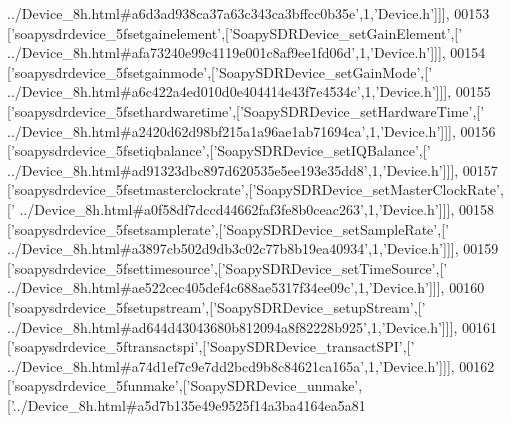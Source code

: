 \begin{DoxyCode}
{      ../Device\_8h.html#a6d3ad938ca37a63c343ca3bffcc0b35e'},1,\textcolor{stringliteral}{'Device.h'}]]],
00153   [\textcolor{stringliteral}{'soapysdrdevice\_5fsetgainelement'},[\textcolor{stringliteral}{'SoapySDRDevice\_setGainElement'},[\textcolor{stringliteral}{'
      ../Device\_8h.html#afa73240e99c4119e001c8af9ee1fd06d'},1,\textcolor{stringliteral}{'Device.h'}]]],
00154   [\textcolor{stringliteral}{'soapysdrdevice\_5fsetgainmode'},[\textcolor{stringliteral}{'SoapySDRDevice\_setGainMode'},[\textcolor{stringliteral}{'
      ../Device\_8h.html#a6c422a4ed010d0e404414e43f7e4534c'},1,\textcolor{stringliteral}{'Device.h'}]]],
00155   [\textcolor{stringliteral}{'soapysdrdevice\_5fsethardwaretime'},[\textcolor{stringliteral}{'SoapySDRDevice\_setHardwareTime'},[\textcolor{stringliteral}{'
      ../Device\_8h.html#a2420d62d98bf215a1a96ae1ab71694ca'},1,\textcolor{stringliteral}{'Device.h'}]]],
00156   [\textcolor{stringliteral}{'soapysdrdevice\_5fsetiqbalance'},[\textcolor{stringliteral}{'SoapySDRDevice\_setIQBalance'},[\textcolor{stringliteral}{'
      ../Device\_8h.html#ad91323dbc897d620535e5ee193e35dd8'},1,\textcolor{stringliteral}{'Device.h'}]]],
00157   [\textcolor{stringliteral}{'soapysdrdevice\_5fsetmasterclockrate'},[\textcolor{stringliteral}{'SoapySDRDevice\_setMasterClockRate'},[\textcolor{stringliteral}{'
      ../Device\_8h.html#a0f58df7dccd44662faf3fe8b0ceac263'},1,\textcolor{stringliteral}{'Device.h'}]]],
00158   [\textcolor{stringliteral}{'soapysdrdevice\_5fsetsamplerate'},[\textcolor{stringliteral}{'SoapySDRDevice\_setSampleRate'},[\textcolor{stringliteral}{'
      ../Device\_8h.html#a3897cb502d9db3c02c77b8b19ea40934'},1,\textcolor{stringliteral}{'Device.h'}]]],
00159   [\textcolor{stringliteral}{'soapysdrdevice\_5fsettimesource'},[\textcolor{stringliteral}{'SoapySDRDevice\_setTimeSource'},[\textcolor{stringliteral}{'
      ../Device\_8h.html#ae522cec405def4c688ae5317f34ee09c'},1,\textcolor{stringliteral}{'Device.h'}]]],
00160   [\textcolor{stringliteral}{'soapysdrdevice\_5fsetupstream'},[\textcolor{stringliteral}{'SoapySDRDevice\_setupStream'},[\textcolor{stringliteral}{'
      ../Device\_8h.html#ad644d43043680b812094a8f82228b925'},1,\textcolor{stringliteral}{'Device.h'}]]],
00161   [\textcolor{stringliteral}{'soapysdrdevice\_5ftransactspi'},[\textcolor{stringliteral}{'SoapySDRDevice\_transactSPI'},[\textcolor{stringliteral}{'
      ../Device\_8h.html#a74d1ef7c9e7dd2bcd9b8c84621ca165a'},1,\textcolor{stringliteral}{'Device.h'}]]],
00162   [\textcolor{stringliteral}{'soapysdrdevice\_5funmake'},[\textcolor{stringliteral}{'SoapySDRDevice\_unmake'},[\textcolor{stringliteral}{'../Device\_8h.html#a5d7b135e49e9525f14a3ba4164ea5a81
}
\end{DoxyCode}
